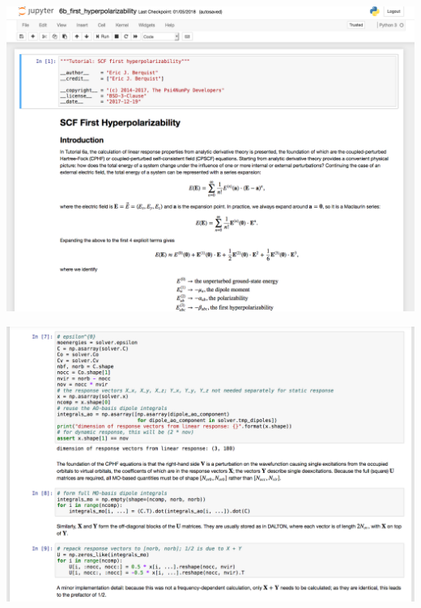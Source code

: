 \documentclass[xcolor=usenames,dvipsnames,svgnames]{beamer}
\begin{document}
\begin{frame}
  \centering
  \includegraphics[width=\linewidth,keepaspectratio]{./figures/psi4numpy_notebook_1.png}
\end{frame}

\begin{frame}
  \centering
  \includegraphics[width=\linewidth,keepaspectratio]{./figures/psi4numpy_notebook_2.png}
\end{frame}
\end{document}
